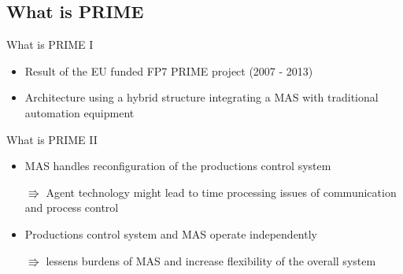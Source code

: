 \documentclass[12pt, xcolor=dvipsnames]{beamer}
\begin{document}
\subsection{What is PRIME}
\begin{frame}{What is PRIME I}
	\begin{itemize}
		\item Result of the EU funded FP7 PRIME project (2007 - 2013)
		\newline
	 
		\item Architecture using a hybrid structure integrating a MAS with traditional automation equipment
		\newline

	\end{itemize}
\end{frame}

\begin{frame}{What is PRIME II}
	\begin{itemize}
		\item MAS handles reconfiguration of the productions control system
		\newline
				
		$\Rrightarrow$ Agent technology might lead to time processing issues of communication and process control
		\newline
		
		\item Productions control system and MAS operate independently
		\newline
		
		$\Rrightarrow$ lessens burdens of MAS and increase flexibility of the overall system
	\end{itemize}
\end{frame}
\end{document}
